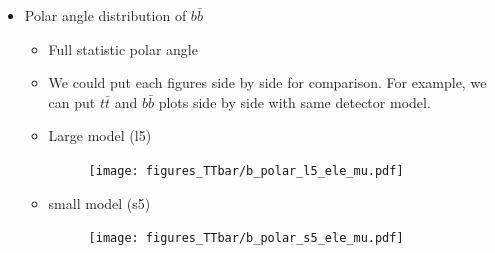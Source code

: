 \documentclass[preprint]{elsarticle}
\begin{document}
\begin{itemize}
  
  \item Polar angle distribution of $b\bar{b}$
  \begin{itemize}
  \item Full statistic polar angle
  \item We could put each figures side by side for comparison. For example, we can put $t\bar{t}$ and $b\bar{b}$ plots side by side with same detector model.
  \item Large model (l5)
  \begin{figure}[H]
  \centering
  \texttt{[image: figures\_TTbar/b\_polar\_l5\_ele\_mu.pdf]}
  \caption{}
  \label{fig:bb_l5_polar_angle}
  \end{figure}

  \item small model (s5)
  \begin{figure}[H]
  \centering
  \texttt{[image: figures\_TTbar/b\_polar\_s5\_ele\_mu.pdf]}
  \caption{}
  \label{fig:bb_s5_polar_angle}
  \end{figure}
  \end{itemize}
  
\end{itemize}
\end{document}
